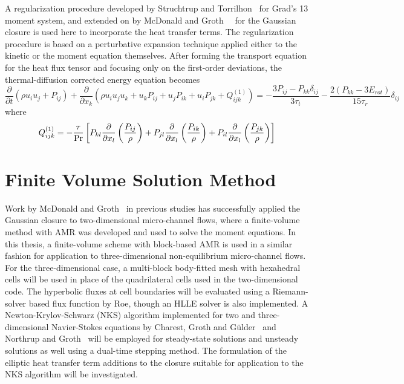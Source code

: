 \documentclass[titlepage,11pt,letterpaper]{article}
\begin{document}
A regularization procedure developed by Struchtrup and Torrilhon~\cite{struchtrup:2003} 
for Grad's 13 moment system, and extended on by McDonald and 
Groth~\cite{mcdonald:2008}~\cite{mcdonald:2010} for the Gaussian closure is used here to 
incorporate the heat transfer terms. The regularization procedure is based on a perturbative 
expansion technique applied either to the kinetic or the moment equation themselves. After 
forming the transport equation for the heat flux tensor and focusing only on the 
first-order deviations, the thermal-diffusion corrected energy equation becomes
%
\begin{equation}\label{eq:energy_correction}
\nonumber \frac{\partial}{\partial t}(\rho u_i u_j + P_{ij}) + 
\frac{\partial}{\partial x_{k}}(\rho u_i u_j u_k + u_k P_{ij} + u_j P_{ik} + u_i P_{jk} + Q^{(1)}_{ijk})
= -\frac{3P_{ij}-P_{kk} \delta_{ij}}{3 \tau_t} -\frac{2\left (P_{kk}-3E_{rot} \right )}{15 \tau_r}\delta_{ij}
\end{equation}
%
where
\begin{equation}\label{eq:qijk}
Q^{(1)}_{ijk}=-\frac{\tau}{\textup{Pr}}
\left [
 P_{kl}\frac{\partial}{\partial x_l}\left(\frac{P_{ij}}{\rho}\right)  
+P_{jl}\frac{\partial}{\partial x_l}\left(\frac{P_{ik}}{\rho}\right)
+P_{il}\frac{\partial}{\partial x_l}\left(\frac{P_{jk}}{\rho}\right) 
\right ]
\end{equation}
%

\section{Finite Volume Solution Method}
Work by McDonald and Groth~\cite{mcdonald:2005a} in previous studies has successfully 
applied the Gaussian closure to two-dimensional micro-channel flows, where a finite-volume 
method with AMR was developed and used to solve the moment equations. In this thesis, a 
finite-volume scheme with block-based AMR is used in a similar fashion for application to 
three-dimensional non-equilibrium micro-channel flows. For the three-dimensional case, a 
multi-block body-fitted mesh with hexahedral cells will be used in place of the 
quadrilateral cells used in the two-dimensional code. The hyperbolic fluxes at cell 
boundaries will be evaluated using a Riemann-solver based flux function by Roe, though an 
HLLE solver is also implemented. A Newton-Krylov-Schwarz (NKS) algorithm implemented for 
two and three-dimensional Navier-Stokes equations by Charest, Groth and 
G\"{u}lder~\cite{charest:2008} and Northrup and Groth~\cite{groth:2005} will be employed 
for steady-state solutions and unsteady solutions as well using a dual-time stepping 
method. The formulation of the elliptic heat transfer term additions to the closure 
suitable for application to the NKS algorithm will be investigated.
\end{document}

